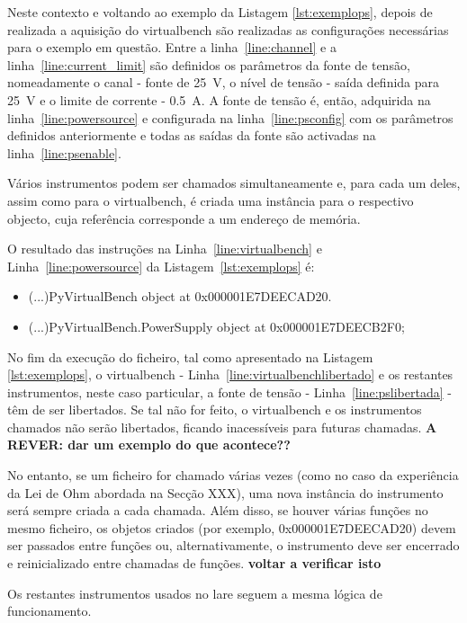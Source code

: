 Neste contexto e voltando ao exemplo da Listagem \ref{lst:exemplops}, depois de realizada a aquisição do \acrshort{virtualbench} são realizadas as configurações necessárias para o exemplo em questão. Entre a linha~\ref{line:channel} e a linha~\ref{line:current_limit} são definidos os parâmetros da fonte de tensão, nomeadamente o canal - fonte de \SI{25}{\volt}, o nível de tensão - saída definida para \SI{25}{\volt} e o limite de corrente - \SI{0.5}{\ampere}. A fonte de tensão é, então, adquirida na linha~\ref{line:powersource} e configurada na linha~\ref{line:psconfig} com os parâmetros definidos anteriormente e todas as saídas da fonte são activadas na linha~\ref{line:psenable}. 

Vários instrumentos podem ser chamados simultaneamente e, para cada um deles, assim como para o \acrshort{virtualbench}, é criada uma instância para o respectivo objecto, cuja referência corresponde a um endereço de memória. 

O resultado das instruções na Linha~\ref{line:virtualbench} e Linha~\ref{line:powersource} da Listagem~\ref{lst:exemplops} é:
\begin{itemize}
	\item (...)PyVirtualBench object at 0x000001E7DEECAD20.
	\item (...)PyVirtualBench.PowerSupply object at 0x000001E7DEECB2F0;
\end{itemize}

No fim da execução do ficheiro, tal como apresentado na Listagem \ref{lst:exemplops}, o \acrshort{virtualbench} - Linha~\ref{line:virtualbenchlibertado} e os restantes instrumentos, neste caso particular, a fonte de tensão - Linha~\ref{line:pslibertada} - têm de ser libertados. Se tal não for feito, o \acrshort{virtualbench} e os instrumentos chamados não serão libertados, ficando inacessíveis para futuras chamadas. \textbf{A REVER: dar um exemplo do que acontece??}

No entanto, se um ficheiro for chamado várias vezes (como no caso da experiência da Lei de Ohm abordada na Secção XXX), uma nova instância do instrumento será sempre criada a cada chamada. Além disso, se houver várias funções no mesmo ficheiro, os objetos criados (por exemplo, 0x000001E7DEECAD20) devem ser passados entre funções ou, alternativamente, o instrumento deve ser encerrado e reinicializado entre chamadas de funções. \textbf{voltar a verificar isto}

Os restantes instrumentos usados no \acrshort{lare}	seguem a mesma lógica de funcionamento.

